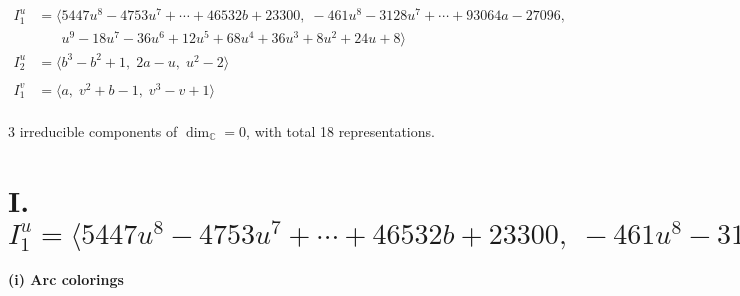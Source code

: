 \documentclass[1p]{elsarticle_modified}
\theoremstyle{definition}
\begin{document}
\begin{align*}
I^u_{1}&=\langle 
5447 u^8-4753 u^7+\cdots+46532 b+23300,\;-461 u^8-3128 u^7+\cdots+93064 a-27096,\\
\phantom{I^u_{1}}&\phantom{= \langle  }u^9-18 u^7-36 u^6+12 u^5+68 u^4+36 u^3+8 u^2+24 u+8\rangle \\
I^u_{2}&=\langle 
b^3- b^2+1,\;2 a- u,\;u^2-2\rangle \\
\\
I^v_{1}&=\langle 
a,\;v^2+b-1,\;v^3- v+1\rangle \\
\end{align*}
\raggedright * 3 irreducible components of $\dim_{\mathbb{C}}=0$, with total 18 representations.\\
\newpage
\renewcommand{\arraystretch}{1}
\centering \section*{I. $I^u_{1}= \langle 5447 u^8-4753 u^7+\cdots+46532 b+23300,\;-461 u^8-3128 u^7+\cdots+93064 a-27096,\;u^9-18 u^7+\cdots+24 u+8 \rangle$}
\flushleft \textbf{(i) Arc colorings}\\
\end{document}

